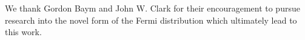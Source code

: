 \documentclass[sn-mathphys,Numbered]{sn-jnl}
\begin{document}






\backmatter

We thank Gordon Baym and John W. Clark for their encouragement to pursue research into the novel form of the Fermi distribution which ultimately lead to this work.


\end{document}

